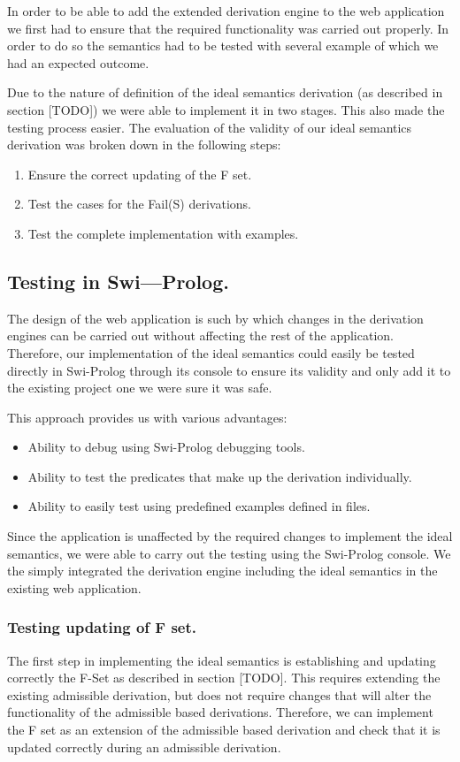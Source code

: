 In order to be able to add the extended derivation engine to the web application we first had to ensure that the required functionality was carried out properly. In order to do so the semantics had to be tested with several example of which we had an expected outcome.

Due to the nature of definition of the ideal semantics derivation (as described in section [TODO]) we were able to implement it in two stages. This also made the testing process easier. The evaluation of the validity of our ideal semantics derivation  was broken down in the following steps:

\begin{enumerate}
\item Ensure the correct updating of the F set.
\item Test the cases for the Fail(S) derivations.
\item Test the complete implementation with examples.
\end{enumerate}

\subsection{Testing in Swi---Prolog.}
The design of the web application is such by which changes in the derivation engines can be carried out without affecting the rest of the application. Therefore, our implementation of the ideal semantics could easily be tested directly in Swi-Prolog through its console to ensure its validity and only add it to the existing project one we were sure it was safe.

This approach provides us with various advantages:

\begin{itemize}
\item Ability to debug using Swi-Prolog debugging tools.
\item Ability to test the predicates that make up the derivation individually.
\item Ability to easily test using predefined examples defined in files.
\end{itemize}

Since the application is unaffected by the required changes to implement the ideal semantics, we were able to carry out the testing using the Swi-Prolog console. We the simply integrated the derivation engine including the ideal semantics in the existing web application.

\subsubsection{Testing updating of F set.}
The first step in implementing the ideal semantics is establishing and updating correctly the F-Set as described in section [TODO]. This requires extending the existing admissible derivation, but does not require changes that will alter the functionality of the admissible based derivations. Therefore, we can implement the F set as an extension of the admissible based derivation and check that it is updated correctly during an admissible derivation.

